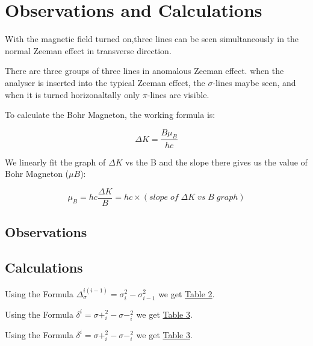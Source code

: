 \section{Observations and Calculations}

	With the magnetic field turned on,three lines can be seen simultaneously in the normal Zeeman effect in transverse direction.

	There are three groups of three lines in anomalous Zeeman effect. when the analyser is inserted into the typical Zeeman effect, the $\sigma$-lines maybe seen, and when it is turned horizonaltally only $\pi$-lines are visible.

	To calculate the Bohr Magneton, the working formula is:

	\begin{equation}
		\Delta K = \frac{B\mu_B}{hc}
		\label{eq:Delta_K}
	\end{equation}

	We linearly fit the graph of $\Delta K$ vs the B and the slope there gives us the value of Bohr Magneton ($\mu B$):

	\begin{equation}
		\mu_B = hc\frac{\Delta K}{B} = hc \times (slope\;of\;\Delta K\;vs\;B\;graph)
		\label{eq:m}
	\end{equation}

	\subsection{Observations}
	

	\subsection{Calculations}
	
	Using the Formula $\Delta_{\sigma}^{i(i-1)} = \sigma_i^2 - \sigma_{i-1}^2$ we get \hyperref[tab:Delta]{Table 2}.

	

	Using the Formula $\delta^i = \sigma+_i^2 - \sigma-_i^2$ we get \hyperref[tab:Delta]{Table 3}.

	

	Using the Formula $\delta^i = \sigma+_i^2 - \sigma-_i^2$ we get \hyperref[tab:Delta]{Table 3}.

	
	

	
